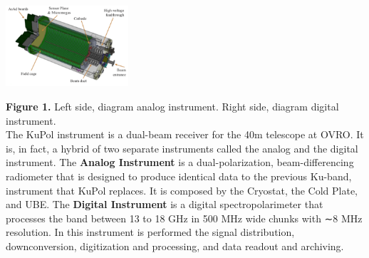 \documentclass[a0paper,portrait]{baposter}
\begin{document}
\begin{poster}
{\begin{center}
\hspace{0.2cm}
\includegraphics [height=30mm] {attpc.png}
\end{center}
\textbf{Figure 1.} Left side, diagram analog instrument. Right side, diagram digital instrument.\\
\small{The KuPol instrument is a dual-beam receiver for the 40m telescope at OVRO. It is, in fact, a hybrid of two separate instruments called the analog and the digital instrument. The \textbf{Analog Instrument} is a dual-polarization, beam-differencing radiometer that is designed to produce identical data to the previous Ku-band, instrument that KuPol replaces. It is composed by the Cryostat, the Cold Plate, and UBE. The \textbf{Digital Instrument} is a digital spectropolarimeter that processes the band between 13 to 18 GHz in 500 MHz wide chunks with ∼8 MHz resolution. In this instrument is performed the signal distribution, downconversion, digitization and processing, and data readout and archiving.}

}
\end{poster}
\end{document}
